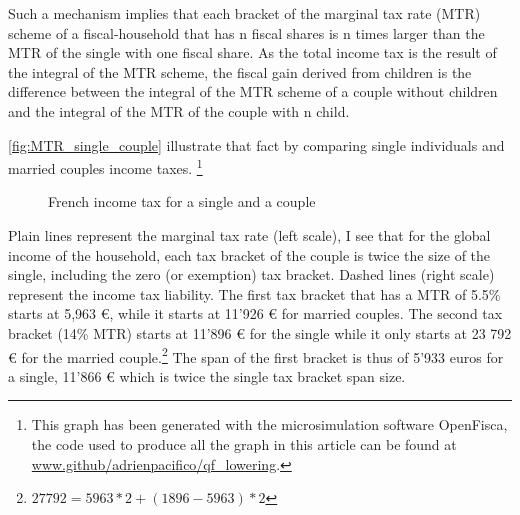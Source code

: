Such a mechanism implies that each bracket of the marginal tax rate (MTR) scheme of a fiscal-household that has n fiscal shares is n times larger than the MTR of the single with one fiscal share. As the total income tax is the result of the integral of the MTR scheme, the fiscal gain derived from children is the difference between the integral of the MTR scheme of a couple without children and the integral of the MTR of the couple with n child.%
\medskip



  \autoref{fig:MTR_single_couple} illustrate that fact by comparing single individuals and married couples income taxes. \footnote{ This graph has been generated with the microsimulation software OpenFisca, the code used to produce all the graph in this article can be found at \url{www.github/adrienpacifico/qf_lowering}.}

  
  
  
  \begin{figure}[H]
    \caption{French income tax for a single and a couple }
    \label{fig:MTR_single_couple}
  \end{figure}
  Plain lines represent the marginal tax rate (left scale), I see that for the global income of the household, each tax bracket of the couple is twice the size of the single, including the zero (or exemption) tax bracket. Dashed lines (right scale) represent the income tax liability.
  The first tax bracket that has a MTR of 5.5\% starts at 5,963 \euro{}, while it starts at 11'926 \euro{} for married couples. The second tax bracket (14\% MTR) starts at 11'896 \euro{} for the single while it only starts at 23 792 \euro{} for the married couple.\footnote{$27792 = 5963*2+(1896-5963)*2$} The span of the first bracket is thus of 5'933 euros for a single,  11'866 \euro{} which is twice the single tax bracket span size.
  
